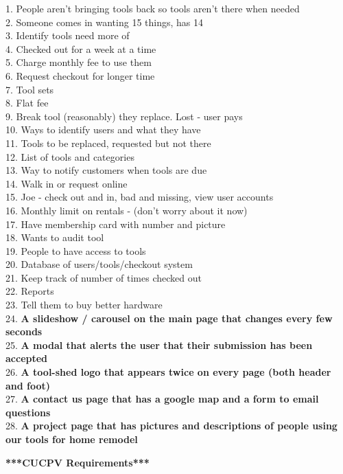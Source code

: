 \documentclass[12pt,letterpaper]{article}
\begin{document}
1. People aren't bringing tools back so tools aren't there when needed\\
2. Someone comes in wanting 15 things, has 14\\
3.  Identify tools need more of\\
4.  Checked out for a week at a time\\
5. Charge monthly fee to use them\\
6.  Request checkout for longer time\\
7. Tool sets\\
8. Flat fee\\
9. Break tool (reasonably) they replace.  Lost - user pays\\
10. Ways to identify users and what they have\\
11. Tools to be replaced, requested but not there\\
12. List of tools and categories\\
13. Way to notify customers when tools are due\\
14. Walk in or request online\\
15. Joe - check out and in, bad and missing, view user accounts\\
16. Monthly limit on rentals - (don't worry about it now)\\
17. Have membership card with number and picture\\
18. Wants to audit tool\\
19. People to have access to tools\\
20. Database of users/tools/checkout system\\
21. Keep track of number of times checked out\\
22. Reports\\
23. Tell them to buy better hardware\\
24. \textbf{A slideshow / carousel on the main page that changes every few seconds}\\
25. \textbf{A modal that alerts the user that their submission has been accepted}\\
26. \textbf{A tool-shed logo that appears twice on every page (both header and foot)}\\
27. \textbf{A contact us page that has a google map and a form to email questions}\\
28. \textbf{A project page that has pictures and descriptions of people using our tools for home remodel }

\newpage
\textbf{***CUCPV Requirements***}
\end{document}
